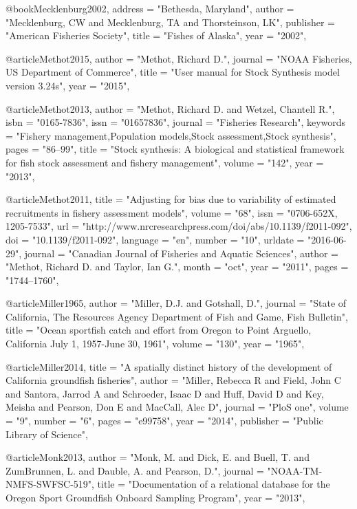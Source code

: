 {@book{Mecklenburg2002,
    address = "{Bethesda, Maryland}",
    author = "{Mecklenburg, CW and Mecklenburg, TA and Thorsteinson, LK}",
    publisher = "{American Fisheries Society}",
    title = "{{Fishes of Alaska}}",
    year = "{2002}",
}

@article{Methot2015,
    author = "{Methot, Richard D.}",
    journal = "{NOAA Fisheries, US Department of Commerce}",
    title = "{{User manual for Stock Synthesis model version 3.24s}}",
    year = "{2015}",
}

@article{Methot2013,
    author = "{Methot, Richard D. and Wetzel, Chantell R.}",
    isbn = "{0165-7836}",
    issn = "{01657836}",
    journal = "{Fisheries Research}",
    keywords = "{Fishery management,Population models,Stock assessment,Stock synthesis}",
    pages = "{86--99}",
    title = "{{Stock synthesis: A biological and statistical framework for fish stock assessment and fishery management}}",
    volume = "{142}",
    year = "{2013}",
}

@article{Methot2011,
    title = "{Adjusting for bias due to variability of estimated recruitments in fishery assessment models}",
    volume = "{68}",
    issn = "{0706-652X, 1205-7533}",
    url = "{http://www.nrcresearchpress.com/doi/abs/10.1139/f2011-092}",
    doi = "{10.1139/f2011-092}",
    language = "{en}",
    number = "{10}",
    urldate = "{2016-06-29}",
    journal = "{Canadian Journal of Fisheries and Aquatic Sciences}",
    author = "{Methot, Richard D. and Taylor, Ian G.}",
    month = "oct",
    year = "{2011}",
    pages = "{1744--1760}",
}

@article{Miller1965,
    author = "{Miller, D.J. and Gotshall, D.}",
    journal = "{State of California, The Resources Agency Department of Fish and Game, Fish Bulletin}",
    title = "{{Ocean sportfish catch and effort from Oregon to Point Arguello, California July 1, 1957-June 30, 1961}}",
    volume = "{130}",
    year = "{1965}",
}

@article{Miller2014,
    title = "{A spatially distinct history of the development of California groundfish fisheries}",
    author = "{Miller, Rebecca R and Field, John C and Santora, Jarrod A and Schroeder, Isaac D and Huff, David D and Key, Meisha and Pearson, Don E and MacCall, Alec D}",
    journal = "{PloS one}",
    volume = "{9}",
    number = "{6}",
    pages = "{e99758}",
    year = "{2014}",
    publisher = "{Public Library of Science}",
}

@article{Monk2013,
    author = "{Monk, M. and Dick, E. and Buell, T. and ZumBrunnen, L. and Dauble, A. and Pearson, D.}",
    journal = "{NOAA-TM-NMFS-SWFSC-519}",
    title = "{{Documentation of a relational database for the Oregon Sport Groundfish Onboard Sampling Program}}",
    year = "{2013}",
}

}
